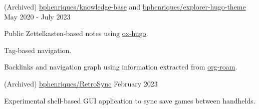 \begin{cventries}
  \vspace{2mm}  

  \openSourceEntry
    {(Archived) \href{https://github.com/bphenriques/knowledge-base}{bphenriques/knowledge-base} and \href{https://github.com/bphenriques/explorer-hugo-theme}{bphenriques/explorer-hugo-theme}}
    {May 2020 - July 2023}
    {    
    \begin{openSourceItems}
        \item Public Zettelkasten-based notes using \href{https://ox-hugo.scripter.co/}{ox-hugo}.
        \item Tag-based navigation.
        \item Backlinks and navigation graph using information extracted from \href{https://www.orgroam.com/}{org-roam}.
    \end{openSourceItems}
    \vspace{4mm}
    }

  \vspace{2mm}

    
\openSourceEntry
    {(Archived) \href{https://github.com/bphenriques/knowledge-base}{bphenriques/RetroSync}}
    {February 2023}
    {   
    \begin{openSourceDescription}
    Experimental shell-based GUI application to sync save games between handhelds.
    \end{openSourceDescription}
    \vspace{4mm}
    }


\end{cventries}
